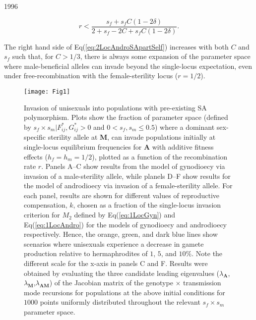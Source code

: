 1996\documentclass[9pt,twocolumn,twoside,lineno]{gsajnl}
\begin{document}
\begin{equation}\label{eq:2LocAndroSApartSelf}
	r < \frac{s_f + s_f C (1 - 2 \delta)}{2 + s_f - 2 C + s_f C (1 - 2 \delta)}.
\end{equation}

\noindent The right hand side of Eq(\ref{eq:2LocAndroSApartSelf}) increases with both $C$ and $s_f$ such that, for $C > 1/3$, there is always some expansion of the parameter space where male-beneficial alleles can invade beyond the single-locus expectation, even under free-recombination with the female-sterility locus ($r = 1/2$). 


\begin{figure}[htbp]
\centering
\texttt{[image: Fig1]}
\caption{Invasion of unisexuals into populations with pre-existing SA polymorphism. Plots show the fraction of parameter space (defined by $s_f \times s_m | F^{\ast}_{ij},G^{\ast}_{ij} > 0$ and $0 < s_f,s_m \leq 0.5$) where a dominant sex-specific sterility allele at $\mathbf{M}$, can invade populations initially at single-locus equilibrium frequencies for $\mathbf{A}$ with additive fitness effects ($h_f=h_m=1/2$), plotted as a function of the recombination rate $r$. Panels A--C show results from the model of gynodioecy via invasion of a male-sterility allele, while planels D--F show results for the model of androdioecy via invasion of a female-sterility allele. For each panel, results are shown for different values of reproductive compensation, $k$, chosen as a fraction of the single-locus invasion criterion for $M_2$ defined by Eq(\ref{eq:1LocGyn}) and Eq(\ref{eq:1LocAndro}) for the models of gynodioecy and androdioecy respectively. Hence, the orange, green, and dark blue lines show scenarios where unisexuals experience a decrease in gamete production relative to hermaphrodites of $1$, $5$, and $10\%$. Note the different scale for the x-axis in panels C and F. Results were obtained by evaluating the three candidate leading eigenvalues ($\lambda_{\mathbf{A}}$,$\lambda_{\mathbf{M}}$,$\lambda_{\mathbf{AM}}$) of the Jacobian matrix of the genotype $\times$ transmission mode recursions for populations at the above initial conditions for $1000$ points uniformly distributed throughout the relevant $s_f \times s_m$ parameter space.}
\label{fig:PrInv}
\end{figure}

\end{document}
